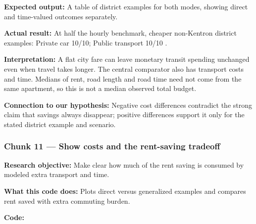 \documentclass[
]{article}
\begin{document}
\textbf{Expected output:} A table of district examples for both modes,
showing direct and time-valued outcomes separately.

\textbf{Actual result:} At half the hourly benchmark, cheaper
non-Kentron district examples: Private car 10/10; Public transport 10/10
.

\textbf{Interpretation:} A flat city fare can leave monetary transit
spending unchanged even when travel takes longer. The central comparator
also has transport costs and time. Medians of rent, road length and road
time need not come from the same apartment, so this is not a median
observed total budget.

\textbf{Connection to our hypothesis:} Negative cost differences
contradict the strong claim that savings always disappear; positive
differences support it only for the stated district example and
scenario.

\subsubsection{Chunk 11 --- Show costs and the rent-saving
tradeoff}\label{chunk-11-show-costs-and-the-rent-saving-tradeoff}

\textbf{Research objective:} Make clear how much of the rent saving is
consumed by modeled extra transport and time.

\textbf{What this code does:} Plots direct versus generalized examples
and compares rent saved with extra commuting burden.

\textbf{Code:}
\end{document}
